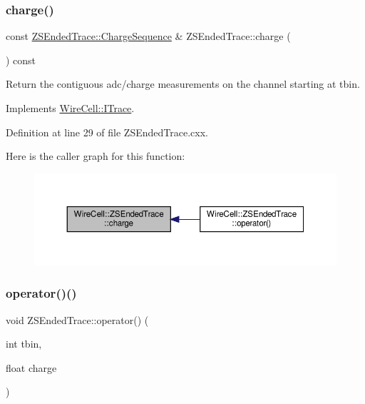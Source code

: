 \subsubsection{\texorpdfstring{charge()}{charge()}}
{\footnotesize\ttfamily const \hyperlink{class_wire_cell_1_1_i_trace_a3dab103257bc46bfd486966f69836954}{Z\+S\+Ended\+Trace\+::\+Charge\+Sequence} \& Z\+S\+Ended\+Trace\+::charge (\begin{DoxyParamCaption}{ }\end{DoxyParamCaption}) const\hspace{0.3cm}{\ttfamily [virtual]}}

Return the contiguous adc/charge measurements on the channel starting at tbin. 

Implements \hyperlink{class_wire_cell_1_1_i_trace_a55a746bfec82aa0214f0462ae28476e0}{Wire\+Cell\+::\+I\+Trace}.



Definition at line 29 of file Z\+S\+Ended\+Trace.\+cxx.

Here is the caller graph for this function\+:
\nopagebreak
\begin{figure}[H]
\begin{center}
\leavevmode
\includegraphics[width=350pt]{class_wire_cell_1_1_z_s_ended_trace_ab2434cf1397e2bc111fd44ffd0afe75e_icgraph}
\end{center}
\end{figure}
\mbox{\label{class_wire_cell_1_1_z_s_ended_trace_ae621cf5fc681fb31197731b313c5093e}} 
\subsubsection{\texorpdfstring{operator()()}{operator()()}}
{\footnotesize\ttfamily void Z\+S\+Ended\+Trace\+::operator() (\begin{DoxyParamCaption}\item[{int}]{tbin,  }\item[{float}]{charge }\end{DoxyParamCaption})}



